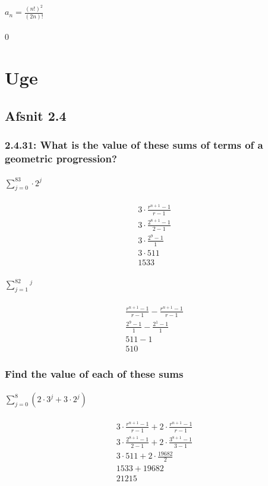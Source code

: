 \documentclass[12pt, a4paper]{report}
\begin{document}
					\subsubsection{$a_n=\frac{(n!)^2}{(2n)!}$}
						$0$
		\chapter{Uge}
			\section{Afsnit 2.4}
				\setcounter{subsection}{30}
				\subsection{2.4.31: What is the value of these sums of terms of a geometric progression?}
					\subsubsection{$\sum\limits_{j=0}^83\cdot 2^j$}
					\begin{align*}
						3\cdot \frac{r^{n+1}-1}{r-1}\\
						3\cdot \frac{2^{8+1}-1}{2-1}\\
						3\cdot \frac{2^9-1}{1}\\
						3\cdot 511\\
						1533
					\end{align*}
					\subsubsection{$\sum\limits_{j=1}^82^j$}
					\begin{align*}
						\frac{r^{n+1}-1}{r-1}-\frac{r^{n+1}-1}{r-1}\\
						\frac{2^9-1}{1}-\frac{2^1-1}{1}\\
						511-1\\
						510
					\end{align*}
				\subsection{Find the value of each of these sums}
					\setcounter{subsubsection}{2}
					\subsubsection{$\sum\limits_{j=0}^8(2\cdot 3^j+3\cdot 2^j)$}
					\begin{align*}
						3\cdot \frac{r^{n+1}-1}{r-1}+2\cdot \frac{r^{n+1}-1}{r-1}\\
						3\cdot \frac{2^{8+1}-1}{2-1}+2\cdot \frac{3^{8+1}-1}{3-1}\\
						3\cdot 511+2\cdot \frac{19682}{2}\\
						1533+19682\\
						21215
					\end{align*}
\end{document}
